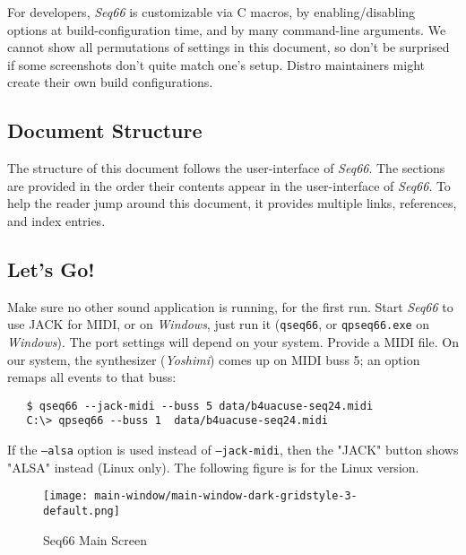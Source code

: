 \documentclass[
 11pt,
 twoside,
 a4paper,
 headinclude,
 footinclude,
 final                                 %
]{article}
\begin{document}
   For developers, \textsl{Seq66} is customizable via C macros,
   by enabling/disabling options at build-configuration time, and by many
   command-line arguments.  We cannot show all permutations of settings in this
   document, so don't be surprised if some screenshots don't quite match
   one's setup.  Distro maintainers might create their own build
   configurations.

\subsection{Document Structure}
\label{subsec:introduction_document_structure}

   The structure of this document follows the user-interface of
   \textsl{Seq66}.  The sections are provided in the order
   their contents appear in the user-interface of \textsl{Seq66}.  To
   help the reader jump around this document, it provides
   multiple links, references, and index entries.

\subsection{Let's Go!}
\label{subsec:introduction_lets_get_started}

   Make sure no other sound application is running, for the first run.
   Start \textsl{Seq66} to use JACK for MIDI, or
   on \textsl{Windows}, just run it (\texttt{qseq66}, or \texttt{qpseq66.exe}
   on \textsl{Windows}).
   The port settings will depend on your system.  Provide a MIDI file.
   On our system, the synthesizer
   (\textsl{Yoshimi}) comes up on MIDI buss 5; an option remaps
   all events to that buss:

\begin{verbatim}
   $ qseq66 --jack-midi --buss 5 data/b4uacuse-seq24.midi
   C:\> qpseq66 --buss 1  data/b4uacuse-seq24.midi
\end{verbatim}

   If the \texttt{--alsa} option is used instead of
   \texttt{--jack-midi}, then the "JACK" button shows "ALSA" instead
   (Linux only).  The following figure is for the Linux
   version.


\begin{figure}[H]
   \centering 
   \texttt{[image: main-window/main-window-dark-gridstyle-3-default.png]}
   \caption{Seq66 Main Screen}
   \label{fig:seq66_main_screen}
\end{figure}
\end{document}
